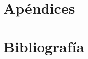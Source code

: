 \chapter{Apéndices}
\newpage
\clearemptydoublepage

\clearemptydoublepage

\chapter{Bibliografía}
\newpage
\clearemptydoublepage
\nocite{*}

%



%
%
\clearemptydoublepage

\printindex


